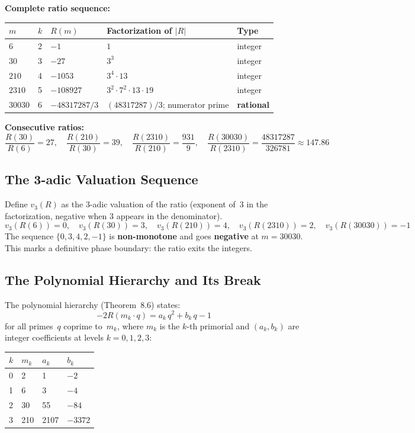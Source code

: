 \documentclass[11pt,letterpaper]{article}
\theoremstyle{definition}
\begin{document}
\textbf{Complete ratio sequence:}

\begin{center}
\begin{tabular}{@{}lllll@{}}
\toprule
$m$ & $k$ & $R(m)$ & Factorization of $|R|$ & Type \\
\midrule
$6$     & 2 & $-1$           & $1$                                   & integer \\
$30$    & 3 & $-27$          & $3^3$                                 & integer \\
$210$   & 4 & $-1053$        & $3^4 \cdot 13$                        & integer \\
$2310$  & 5 & $-108927$      & $3^2 \cdot 7^2 \cdot 13 \cdot 19$     & integer \\
$30030$ & 6 & $-48317287/3$  & $(48317287)/3$; numerator prime       & \textbf{rational} \\
\bottomrule
\end{tabular}
\end{center}

\textbf{Consecutive ratios:}
\[
\frac{R(30)}{R(6)} = 27, \quad
\frac{R(210)}{R(30)} = 39, \quad
\frac{R(2310)}{R(210)} = \frac{931}{9}, \quad
\frac{R(30030)}{R(2310)} = \frac{48317287}{326781} \approx 147.86
\]

\subsection{The 3-adic Valuation Sequence}

Define $v_3(R)$ as the 3-adic valuation of the ratio (exponent of~3 in the factorization, negative when 3 appears in the denominator).
\[
v_3(R(6)) = 0, \quad
v_3(R(30)) = 3, \quad
v_3(R(210)) = 4, \quad
v_3(R(2310)) = 2, \quad
v_3(R(30030)) = -1
\]
The sequence $\{0, 3, 4, 2, -1\}$ is \textbf{non-monotone} and goes \textbf{negative} at $m = 30030$. This marks a definitive phase boundary: the ratio exits the integers.

\subsection{The Polynomial Hierarchy and Its Break}

The polynomial hierarchy (Theorem~8.6) states:
\[
-2R(m_k \cdot q) = a_k \, q^2 + b_k \, q - 1
\]
for all primes~$q$ coprime to~$m_k$, where $m_k$ is the $k$-th primorial and $(a_k, b_k)$ are integer coefficients at levels $k = 0, 1, 2, 3$:

\begin{center}
\begin{tabular}{@{}llll@{}}
\toprule
$k$ & $m_k$ & $a_k$ & $b_k$ \\
\midrule
0 & 2   & 1    & $-2$    \\
1 & 6   & 3    & $-4$    \\
2 & 30  & 55   & $-84$   \\
3 & 210 & 2107 & $-3372$ \\
\bottomrule
\end{tabular}
\end{center}
\end{document}
